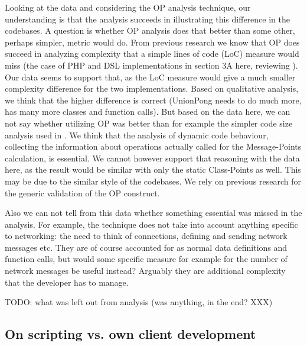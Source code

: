 \documentclass[conference]{IEEEtran}
\begin{document}
Looking at the data and considering the OP analysis technique, our
understanding is that the analysis succeeds in illustrating this
difference in the codebases. A question is whether OP analysis does
that better than some other, perhaps simpler, metric would do. From
previous research we know that OP does succeed in analyzing complexity
that a simple lines of code (LoC) measure would miss (the case of PHP
and DSL implementations in section 3A here, reviewing
\cite{api-complexity-analysis}). Our data seems to support that, as the
LoC measure would give a much smaller complexity difference for the
two implementations. Based on qualitative analysis, we think that the
higher difference is correct (UnionPong needs to do much more, has
many more classes and function calls). But based on the data here, we
can not say whether utilizing OP was better than for example the
simpler code size analysis used in \cite{cmu-api_failures}. We think that
the analysis of dynamic code behaviour, collecting the information
about operations actually called for the Message-Points calculation,
is essential. We cannot however support that reasoning with the data
here, as the result would be similar with only the static Class-Points
as well. This may be due to the similar style of the codebases. We
rely on previous research for the generic validation of the OP
construct.

Also we can not tell from this data whether something essential was
missed in the analysis. For example, the technique does not take into
account anything specific to networking: the need to think of
connections, defining and sending network messages etc. They are of
course accounted for as normal data definitions and function calls,
but would some specific measure for example for the number of network
messages be useful instead? Arguably they are additional complexity
that the developer has to manage.

TODO: what was left out from analysis (was anything, in the end? XXX)


\subsection{On scripting vs. own client development%
  \label{on-scripting-vs-own-client-development}%
}
\end{document}
